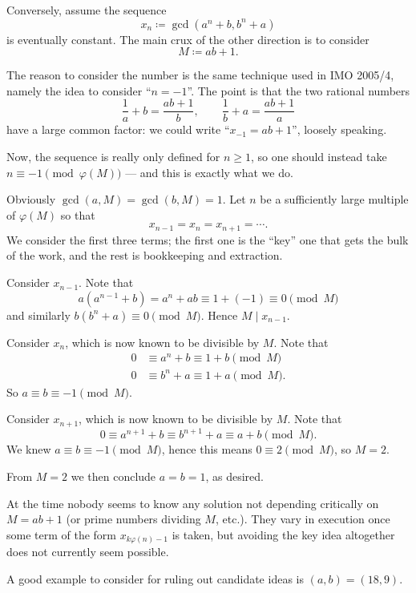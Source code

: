 \documentclass[11pt]{scrartcl}
\begin{document}
Conversely, assume the sequence
\[ x_n \coloneq \gcd(a^n+b, b^n+a) \] is eventually constant.
The main crux of the other direction is to consider
\[ M \coloneq ab+1. \]
\begin{remark*}
  [Motivation]
  The reason to consider the number is the same technique used in IMO 2005/4,
  namely the idea to consider ``$n = -1$''.
  The point is that the two rational numbers
  \[ \frac 1a + b = \frac{ab+1}{b}, \qquad \frac 1b + a = \frac{ab+1}{a} \]
  have a large common factor: we could write ``$x_{-1} = ab + 1$'', loosely speaking.

  Now, the sequence is really only defined for $n \ge 1$,
  so one should instead take $n \equiv -1 \pmod{\varphi(M)}$
  --- and this is exactly what we do.
\end{remark*}
Obviously $\gcd(a,M) = \gcd(b,M) = 1$.
Let $n$ be a sufficiently large multiple of $\varphi(M)$
so that \[ x_{n-1} = x_n = x_{n+1} = \dotsb. \]
We consider the first three terms;
the first one is the ``key'' one that gets the bulk of the work,
and the rest is bookkeeping and extraction.
\begin{itemize}
  \ii Consider $x_{n-1}$.
  Note that
  \[ a (a^{n-1} + b) = a^n + ab \equiv 1 + (-1) \equiv 0 \pmod M \]
  and similarly $b (b^n + a) \equiv 0 \pmod M$.
  Hence $M \mid x_{n-1}$.

  \ii Consider $x_n$, which is now known to be divisible by $M$. Note that
  \begin{align*}
    0 &\equiv a^n + b \equiv 1 + b \pmod M \\
    0 &\equiv b^n + a \equiv 1 + a \pmod M.
  \end{align*}
  So $a \equiv b \equiv -1 \pmod M$.

  \ii Consider $x_{n+1}$, which is now known to be divisible by $M$. Note that
  \[ 0 \equiv a^{n+1} + b \equiv b^{n+1} + a \equiv a + b \pmod M. \]
  We knew $a \equiv b \equiv -1 \pmod M$,
  hence this means $0 \equiv 2 \pmod M$, so $M = 2$.
\end{itemize}
From $M = 2$ we then conclude $a = b = 1$, as desired.

\begin{remark*}
  At the time nobody seems to know any solution not depending critically
  on $M = ab+1$ (or prime numbers dividing $M$, etc.).
  They vary in execution once some term of the form $x_{k\varphi(n)-1}$ is taken,
  but avoiding the key idea altogether does not currently seem possible.

  A good example to consider for ruling out candidate ideas is $(a,b) = (18,9)$.
\end{remark*}
\pagebreak
\end{document}
